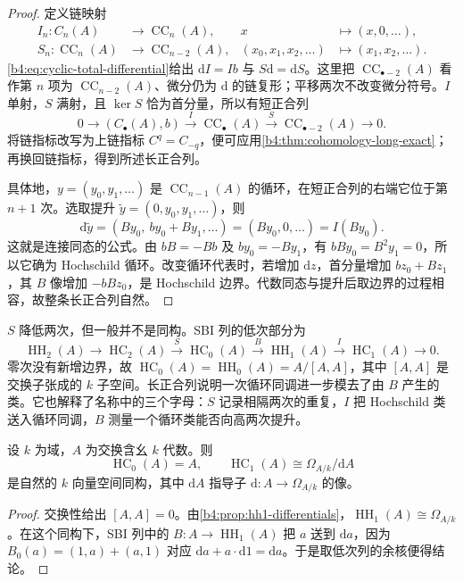 \begin{proof}
	定义链映射
	\[
		\begin{aligned}
			I_n:C_n(A)&\longrightarrow\operatorname{CC}_n(A),&
			x&\longmapsto(x,0,\ldots),\\
			S_n:\operatorname{CC}_n(A)&\longrightarrow\operatorname{CC}_{n-2}(A),&
			(x_0,x_1,x_2,\ldots)&\longmapsto(x_1,x_2,\ldots).
		\end{aligned}
	\]
	\eqref{b4:eq:cyclic-total-differential}给出 \(\mathrm{d}I=Ib\) 与 \(S\mathrm{d}=\mathrm{d}S\)。这里把 \(\operatorname{CC}_{\bullet-2}(A)\) 看作第 \(n\) 项为 \(\operatorname{CC}_{n-2}(A)\)、微分仍为 \(\mathrm d\) 的链复形；平移两次不改变微分符号。\(I\) 单射，\(S\) 满射，且 \(\ker S\) 恰为首分量，所以有短正合列
	\[
		0\longrightarrow(C_\bullet(A),b)
		\xrightarrow{I}\operatorname{CC}_\bullet(A)
		\xrightarrow{S}\operatorname{CC}_{\bullet-2}(A)\longrightarrow0.
	\]
	将链指标改写为上链指标 \(C^q=C_{-q}\)，便可应用\cref{b4:thm:cohomology-long-exact}；再换回链指标，得到所述长正合列。

	具体地，\(y=(y_0,y_1,\ldots)\) 是 \(\operatorname{CC}_{n-1}(A)\) 的循环，在短正合列的右端它位于第 \(n+1\) 次。选取提升 \(\widetilde y=(0,y_0,y_1,\ldots)\)，则
	\[
		\mathrm d\widetilde y=(B y_0,\ b y_0+B y_1,\ldots)=(B y_0,0,\ldots)=I(B y_0).
	\]
	这就是连接同态的公式。由 \(bB=-Bb\) 及 \(b y_0=-B y_1\)，有 \(bB y_0=B^2y_1=0\)，所以它确为 Hochschild 循环。改变循环代表时，若增加 \(\mathrm dz\)，首分量增加 \(b z_0+B z_1\)，其 \(B\) 像增加 \(-bB z_0\)，是 Hochschild 边界。代数同态与提升后取边界的过程相容，故整条长正合列自然。
\end{proof}

\(S\) 降低两次，但一般并不是同构。SBI 列的低次部分为
\[
	\operatorname{HH}_2(A)\longrightarrow\operatorname{HC}_2(A)
	\xrightarrow{S}\operatorname{HC}_0(A)
	\xrightarrow{B}\operatorname{HH}_1(A)
	\xrightarrow{I}\operatorname{HC}_1(A)\longrightarrow0.
\]
零次没有新增边界，故 \(\operatorname{HC}_0(A)=\operatorname{HH}_0(A)=A/[A,A]\)，其中 \([A,A]\) 是交换子张成的 \(k\) 子空间。长正合列说明一次循环同调进一步模去了由 \(B\) 产生的类。它也解释了名称中的三个字母：\(S\) 记录相隔两次的重复，\(I\) 把 Hochschild 类送入循环同调，\(B\) 测量一个循环类能否向高两次提升。

\begin{corollary}\label{b4:cor:cyclic-first-differentials}
	设 \(k\) 为域，\(A\) 为交换含幺 \(k\) 代数。则
	\[
		\operatorname{HC}_0(A)=A,\qquad
		\operatorname{HC}_1(A)\cong\Omega_{A/k}/\mathrm dA
	\]
	是自然的 \(k\) 向量空间同构，其中 \(\mathrm dA\) 指导子 \(\mathrm d:A\to\Omega_{A/k}\) 的像。
\end{corollary}
\begin{proof}
	交换性给出 \([A,A]=0\)。由\cref{b4:prop:hh1-differentials}，\(\operatorname{HH}_1(A)\cong\Omega_{A/k}\)。在这个同构下，SBI 列中的 \(B:A\to\operatorname{HH}_1(A)\) 把 \(a\) 送到 \(\mathrm d a\)，因为 \(B_0(a)=(1,a)+(a,1)\) 对应 \(\mathrm d a+a\cdot\mathrm d1=\mathrm d a\)。于是取低次列的余核便得结论。
\end{proof}

